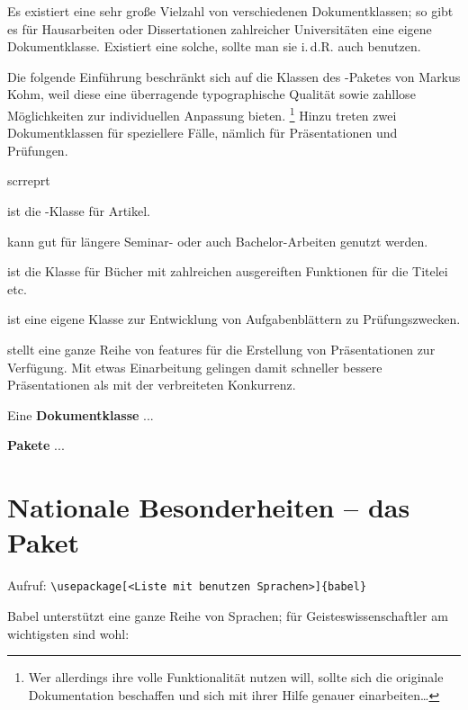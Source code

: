 Es existiert eine sehr große Vielzahl von verschiedenen Dokumentklassen;
so gibt es für Hausarbeiten oder Dissertationen zahlreicher Universitäten eine eigene
Dokumentklasse. Existiert eine solche, sollte man sie i.\,d.R. auch benutzen.

Die folgende Einführung beschränkt sich auf die Klassen des \KOMAScript-Paketes von
Markus Kohm, weil diese eine überragende typographische Qualität sowie zahllose Möglichkeiten
zur individuellen Anpassung bieten.%
\footnote{Wer allerdings ihre volle Funktionalität nutzen will, sollte sich die originale 
Dokumentation beschaffen und sich mit ihrer Hilfe genauer einarbeiten\dots}
Hinzu treten zwei Dokumentklassen für speziellere Fälle, nämlich für Präsentationen und 
Prüfungen.

\begin{labeling}{scrreprt}
 \item[scrartcl] ist die \KOMAScript-Klasse für Artikel.
 \item[scrreprt] kann gut für längere Seminar- oder auch Bachelor-Arbeiten genutzt werden.
 \item[scrbook] ist die Klasse für Bücher mit zahlreichen ausgereiften Funktionen für
  die Titelei etc.
 \item[exam] ist eine eigene Klasse zur Entwicklung von Aufgabenblättern zu Prüfungszwecken.
 \item[beamer] stellt eine ganze Reihe von features für die Erstellung von Präsentationen
  zur Verfügung. Mit etwas Einarbeitung gelingen damit schneller bessere Präsentationen als 
  mit der verbreiteten Konkurrenz.
\end{labeling}



Eine \textbf{Dokumentklasse} ...

\textbf{Pakete} ...


\section{Nationale Besonderheiten -- das Paket }
\label{babel}



Aufruf: \lstinline/\usepackage[<Liste mit benutzen Sprachen>]{babel}/ 

Babel unterstützt eine ganze Reihe von Sprachen; für Geisteswissenschaftler am wichtigsten sind
wohl:


